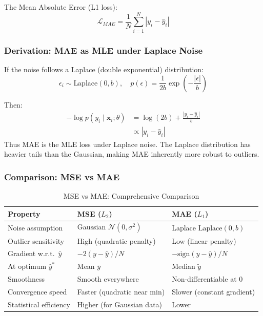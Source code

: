 The Mean Absolute Error (L1 loss):
\begin{equation}
\mathcal{L}_{MAE} = \frac{1}{N}\sum_{i=1}^{N} |y_i - \hat{y}_i|
\end{equation}

\subsubsection{Derivation: MAE as MLE under Laplace Noise}

If the noise follows a Laplace (double exponential) distribution:
\begin{equation}
\epsilon_i \sim \text{Laplace}(0, b), \quad p(\epsilon) = \frac{1}{2b}\exp\left(-\frac{|\epsilon|}{b}\right)
\end{equation}

Then:
\begin{align}
-\log p(y_i \mid \mathbf{x}_i; \theta) &= \log(2b) + \frac{|y_i - \hat{y}_i|}{b} \\
&\propto |y_i - \hat{y}_i|
\end{align}
Thus MAE is the MLE loss under Laplace noise. The Laplace distribution has heavier tails than the Gaussian, making MAE inherently more robust to outliers.

\subsubsection{Comparison: MSE vs MAE}

\begin{table}[ht]
    \centering
    \caption{MSE vs MAE: Comprehensive Comparison}
    \begin{tabular}{L{3cm} L{4cm} L{4.5cm}}
        \toprule
        \textbf{Property} & \textbf{MSE ($L_2$)} & \textbf{MAE ($L_1$)} \\
        \midrule
        Noise assumption & Gaussian $\mathcal{N}(0, \sigma^2)$ & Laplace $\text{Laplace}(0, b)$ \\
        Outlier sensitivity & High (quadratic penalty) & Low (linear penalty) \\
        Gradient w.r.t.\ $\hat{y}$ & $-2(y - \hat{y})/N$ & $-\text{sign}(y - \hat{y})/N$ \\
        At optimum $\hat{y}^*$ & Mean $\bar{y}$ & Median $\tilde{y}$ \\
        Smoothness & Smooth everywhere & Non-differentiable at 0 \\
        Convergence speed & Faster (quadratic near min) & Slower (constant gradient) \\
        Statistical efficiency & Higher (for Gaussian data) & Lower \\
        \bottomrule
    \end{tabular}
\end{table}

